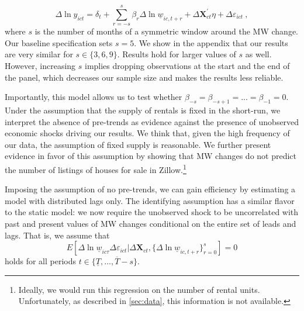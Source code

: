 \begin{equation} \label{eq:leads_lags}
	\Delta \ln y_{ict} = \delta_t
						+ \sum_{r=-s}^{s} \beta_r \Delta \ln \underline{w}_{ic,t+r}
						+ \Delta \mathbf{X}^{'}_{ct}\eta
						+ \Delta \varepsilon_{ict} \ ,
\end{equation}
where $s$ is the number of months of a symmetric window around the MW change. Our baseline
specification sets $s = 5$. We show in the appendix that our results are very similar for
$s \in \{3, 6, 9\}$. Results hold for larger values of $s$ as well. However, increasing $s$ 
implies dropping observations at the start and the end of the panel, which decreases our 
sample size and makes the results less reliable.

Importantly, this model allows us to test whether $\beta_{-s} = \beta_{-s+1} = ... 
= \beta_{-1} = 0$. Under the assumption that the supply of rentals is fixed in the short-run, 
we interpret the absence of pre-trends as evidence against the presence of unobserved economic 
shocks driving our results. We think that, given the high frequency of our data, the 
assumption of fixed supply is reasonable. We further present evidence in favor of this 
assumption by showing that MW changes do not predict the number of listings of houses for sale 
in Zillow.\footnote{Ideally, we would run this regression on the number of rental units. 
	Unfortunately, as described in \autoref{sec:data}, this information is not available.}

Imposing the assumption of no pre-trends, we can gain efficiency by estimating a model with 
distributed lags only. %
The identifying assumption has a similar flavor to the static model: we now require the 
unobserved shock to be uncorrelated with past and present values of MW changes conditional 
on the entire set of leads and lags. That is, we assume that
\begin{equation*}\label{eq:identifying-lags}
	E\left[\Delta \ln \underline{w}_{ic \tau} \Delta \varepsilon_{ict} | 
			\Delta \mathbf{X}_{ct}, \{\Delta \ln \underline{w}_{ic,t+r}\}_{r=0}^s \right] = 0
\end{equation*}
holds for all periods $t \in \{\underline{T}, ..., \overline{T} - s\}$.


